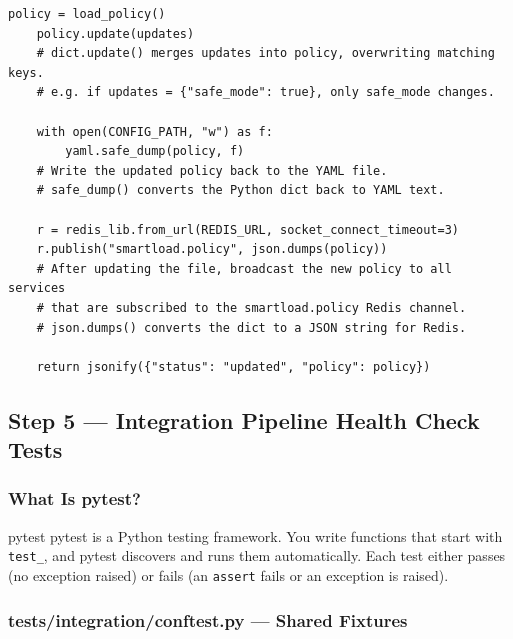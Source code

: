 \documentclass[12pt, a4paper]{article}
\begin{document}
\begin{lstlisting}[style=python, caption={services/policy-manager/app.py --- policy REST API}]
    policy = load_policy()
    policy.update(updates)
    # dict.update() merges updates into policy, overwriting matching keys.
    # e.g. if updates = {"safe_mode": true}, only safe_mode changes.

    with open(CONFIG_PATH, "w") as f:
        yaml.safe_dump(policy, f)
    # Write the updated policy back to the YAML file.
    # safe_dump() converts the Python dict back to YAML text.

    r = redis_lib.from_url(REDIS_URL, socket_connect_timeout=3)
    r.publish("smartload.policy", json.dumps(policy))
    # After updating the file, broadcast the new policy to all services
    # that are subscribed to the smartload.policy Redis channel.
    # json.dumps() converts the dict to a JSON string for Redis.

    return jsonify({"status": "updated", "policy": policy})
\end{lstlisting}

\subsection{Step 5 --- Integration Pipeline Health Check Tests}
\label{sec:tests}

\subsubsection{What Is pytest?}

\begin{definitionbox}{pytest}
pytest is a Python testing framework. You write functions that start with
\texttt{test\_}, and pytest discovers and runs them automatically. Each test
either passes (no exception raised) or fails (an \texttt{assert} fails or an
exception is raised).
\end{definitionbox}

\subsubsection{tests/integration/conftest.py --- Shared Fixtures}
\end{document}

